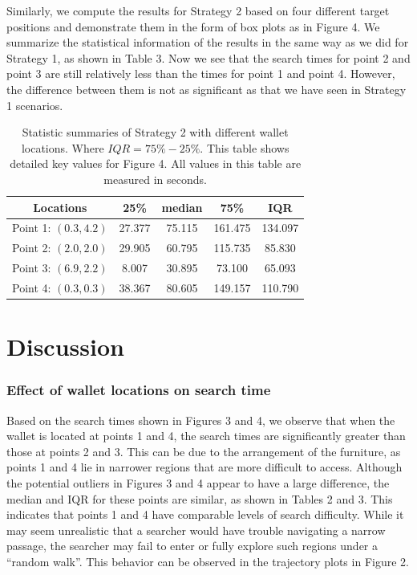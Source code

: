 \documentclass{article}
\begin{document}
\noindent Similarly, we compute the results for Strategy 2 based on four different target positions and demonstrate them in the form of box plots as in Figure 4. We summarize the statistical information of the results in the same way as we did for Strategy 1, as shown in Table 3. Now we see that the search times for point 2 and point 3 are still relatively less than the times for point 1 and point 4. However, the difference between them is not as significant as that we have seen in Strategy 1 scenarios.


\begin{table}[h]
\centering
\label{tab:time_stats_s2}
\begin{tabular}{c|c|c|c|c}
\textbf{Locations} & \textbf{25\%} & \textbf{median} & \textbf{75\%} & \textbf{IQR} \\ \hline
Point 1: $(0.3, 4.2)$ & 27.377 & 75.115 & 161.475 & 134.097 \\ 
Point 2: $(2.0, 2.0)$ & 29.905 & 60.795 & 115.735 & 85.830 \\ 
Point 3: $(6.9, 2.2)$ & 8.007 & 30.895 & 73.100 & 65.093 \\ 
Point 4: $(0.3, 0.3)$ & 38.367 & 80.605 & 149.157 & 110.790 \\
\end{tabular}
\captionsetup{font=small}
\caption{Statistic summaries of Strategy 2 with different wallet locations. Where $IQR = 75\% - 25\%$. This table shows detailed key values for Figure 4. All values in this table are measured in seconds.}
\end{table}

\section{Discussion}
\subsubsection*{Effect of wallet locations on search time}
Based on the search times shown in Figures 3 and 4, we observe that when the wallet is located at points 1 and 4, the search times are significantly greater than those at points 2 and 3. This can be due to the arrangement of the furniture, as points 1 and 4 lie in narrower regions that are more difficult to access. Although the potential outliers in Figures 3 and 4 appear to have a large difference, the median and IQR for these points are similar, as shown in Tables 2 and 3. This indicates that points 1 and 4 have comparable levels of search difficulty. While it may seem unrealistic that a searcher would have trouble navigating a narrow passage, the searcher may fail to enter or fully explore such regions under a ``random walk''. This behavior can be observed in the trajectory plots in Figure 2.
\end{document}

